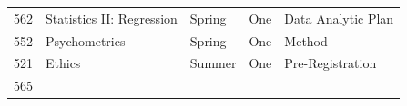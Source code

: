 \documentclass[
  openany]{book}
\begin{document}
\begin{longtable}[]{@{}lllll@{}}
\begin{minipage}[t]{0.03\columnwidth}
562\strut
\end{minipage} & \begin{minipage}[t]{0.27\columnwidth}\raggedright
Statistics II: Regression\strut
\end{minipage} & \begin{minipage}[t]{0.26\columnwidth}\raggedright
Spring\strut
\end{minipage} & \begin{minipage}[t]{0.10\columnwidth}\raggedright
One\strut
\end{minipage} & \begin{minipage}[t]{0.19\columnwidth}\raggedright
Data Analytic Plan\strut
\end{minipage}\tabularnewline
\begin{minipage}[t]{0.03\columnwidth}\raggedright
552\strut
\end{minipage} & \begin{minipage}[t]{0.27\columnwidth}\raggedright
Psychometrics\strut
\end{minipage} & \begin{minipage}[t]{0.26\columnwidth}\raggedright
Spring\strut
\end{minipage} & \begin{minipage}[t]{0.10\columnwidth}\raggedright
One\strut
\end{minipage} & \begin{minipage}[t]{0.19\columnwidth}\raggedright
Method\strut
\end{minipage}\tabularnewline
\begin{minipage}[t]{0.03\columnwidth}\raggedright
521\strut
\end{minipage} & \begin{minipage}[t]{0.27\columnwidth}\raggedright
Ethics\strut
\end{minipage} & \begin{minipage}[t]{0.26\columnwidth}\raggedright
Summer\strut
\end{minipage} & \begin{minipage}[t]{0.10\columnwidth}\raggedright
One\strut
\end{minipage} & \begin{minipage}[t]{0.19\columnwidth}\raggedright
Pre-Registration\strut
\end{minipage}\tabularnewline
\begin{minipage}[t]{0.03\columnwidth}\raggedright
565\strut
\end{minipage} & \begin{minipage}[t]{0.27\columnwidth}\raggedright

\end{minipage}
\end{longtable}
\end{document}
